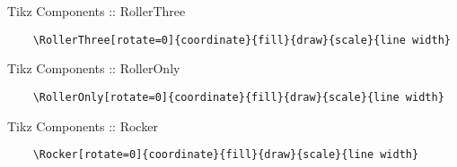 \documentclass[9pt,svgnames,x11names]{beamer}
\begin{document}

\begin{frame}[fragile]{Tikz Components :: RollerThree}

    \footnotesize
    \begin{verbatim}
    \RollerThree[rotate=0]{coordinate}{fill}{draw}{scale}{line width}
  \end{verbatim}

    \vspace{1cm}
    \centering


\end{frame}


\begin{frame}[fragile]{Tikz Components :: RollerOnly}

    \footnotesize
    \begin{verbatim}
    \RollerOnly[rotate=0]{coordinate}{fill}{draw}{scale}{line width}
  \end{verbatim}

    \centering
    \vspace{1cm}


\end{frame}


\begin{frame}[fragile]{Tikz Components :: Rocker}

    \footnotesize
    \begin{verbatim}
    \Rocker[rotate=0]{coordinate}{fill}{draw}{scale}{line width}
  \end{verbatim}
    \centering
    \vspace{1cm}


\end{frame}
\end{document}
